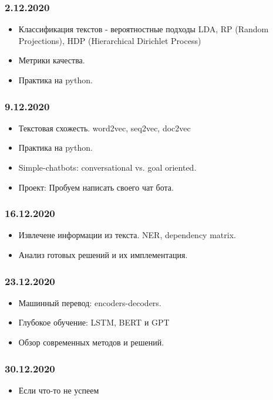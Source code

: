 \documentclass[a4paper,11pt]{article}
\begin{document}
\subsubsection{2.12.2020}
\begin{itemize}
	\item Классификация текстов - вероятностные подходы LDA, RP (Random Projections), HDP (Hierarchical Dirichlet Process)
	\item Метрики качества. 
	\item Практика на python. 
\end{itemize}
\subsubsection{9.12.2020}
\begin{itemize}
	\item Текстовая схожесть. word2vec, seq2vec, doc2vec
	\item Практика на python.
	\item Simple-chatbots: conversational vs. goal oriented.
	\item Проект: Пробуем написать своего чат бота.
	
\end{itemize}
\subsubsection{16.12.2020}
\begin{itemize}
	\item Извлечене информации из текста. NER, dependency matrix.
	\item Анализ готовых решений и их имплементация.
\end{itemize}
\subsubsection{23.12.2020}
\begin{itemize}
	\item Машинный перевод: encoders-decoders.
	\item Глубокое обучение: LSTM, BERT и GPT
	\item Обзор современных методов и решений.
\end{itemize}
\subsubsection{30.12.2020}
\begin{itemize}
	\item Если что-то не успеем
\end{itemize}
\end{document}
